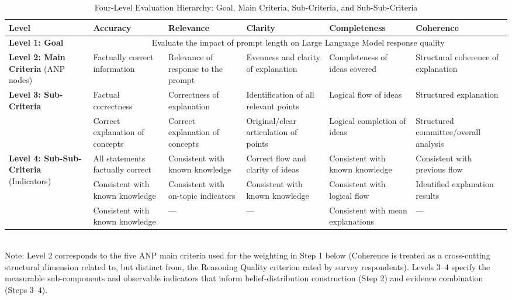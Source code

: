 \documentclass[conference]{IEEEtran}
\begin{document}
\begin{table}[htbp]
\caption{Four-Level Evaluation Hierarchy: Goal, Main Criteria, Sub-Criteria, and Sub-Sub-Criteria}
\label{tab:hierarchy}
\centering
\small
\begin{tabular}{p{1.6cm}p{3.0cm}p{3.0cm}p{3.0cm}p{3.0cm}p{3.0cm}}
\toprule
\textbf{Level} & \textbf{Accuracy} & \textbf{Relevance} & \textbf{Clarity} & \textbf{Completeness} & \textbf{Coherence} \\
\midrule
\textbf{Level 1: Goal} & \multicolumn{5}{c}{Evaluate the impact of prompt length on Large Language Model response quality} \\
\midrule
\textbf{Level 2: Main Criteria} (ANP nodes) & Factually correct information & Relevance of response to the prompt & Evenness and clarity of explanation & Completeness of ideas covered & Structural coherence of explanation \\
\midrule
\multirow{2}{1.6cm}{\textbf{Level 3: Sub-Criteria}} & Factual correctness & Correctness of explanation & Identification of all relevant points & Logical flow of ideas & Structured explanation \\
 & Correct explanation of concepts & Correct explanation of concepts & Original/clear articulation of points & Logical completion of ideas & Structured committee/overall analysis \\
\midrule
\multirow{3}{1.6cm}{\textbf{Level 4: Sub-Sub-Criteria} (Indicators)} & All statements factually correct & Consistent with known knowledge & Correct flow and clarity of ideas & Consistent with known knowledge & Consistent with previous flow \\
 & Consistent with known knowledge & Consistent with on-topic indicators & Consistent with known knowledge & Consistent with logical flow & Identified explanation results \\
 & Consistent with known knowledge & --- & --- & Consistent with mean explanations & --- \\
\bottomrule
\end{tabular}
\\[4pt]
\footnotesize{Note: Level 2 corresponds to the five ANP main criteria used for the weighting in Step 1 below (Coherence is treated as a cross-cutting structural dimension related to, but distinct from, the Reasoning Quality criterion rated by survey respondents). Levels 3--4 specify the measurable sub-components and observable indicators that inform belief-distribution construction (Step 2) and evidence combination (Steps 3--4).}
\end{table}
\end{document}
